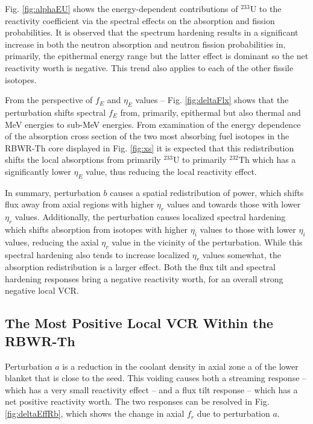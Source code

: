 \documentclass[11pt]{article}
\newcommand{\iso}[2]{$^{#2}\mathrm{#1}$}
\begin{document}
Fig. \ref{fig:alphaEU} shows the energy-dependent contributions of \iso{U}{233} to the reactivity coefficient via the spectral effects on the absorption and fission probabilities.
It is observed that the spectrum hardening results in a significant increase in both the neutron absorption and neutron fission probabilities in, primarily, the epithermal energy range but the latter effect is dominant so the net reactivity worth is negative.
This trend also applies to each of the other fissile isotopes.

From the perspective of $f_E$ and $\eta_E$ values -- Fig. \ref{fig:deltaFlx} shows that the perturbation shifts spectral $f_E$ from, primarily, epithermal but also thermal and MeV energies to sub-MeV energies.
From examination of the energy dependence of the absorption cross section of the two most absorbing fuel isotopes in the RBWR-Th core displayed in Fig. \ref{fig:xs} it is expected that this redistribution shifts the local absorptions from primarily \iso{U}{233} to primarily \iso{Th}{232} which has a significantly lower $\eta_E$ value, thus reducing the local reactivity effect.

In summary, perturbation $b$ causes a spatial redistribution of power, which shifts flux away from axial regions with higher $\eta_r$ values and towards those with lower $\eta_r$ values.
Additionally, the perturbation causes localized spectral hardening which shifts absorption from isotopes with higher $\eta_i$ values to those with lower $\eta_i$ values, reducing the axial $\eta_r$ value in the vicinity of the perturbation.
While this spectral hardening also tends to increase localized $\eta_r$ values somewhat, the absorption redistribution is a larger effect.
Both the flux tilt and spectral hardening responses bring a negative reactivity worth, for an overall strong negative local VCR.

\subsection{The Most Positive Local VCR Within the RBWR-Th}

Perturbation $a$ is a reduction in the coolant density in axial zone a of the lower blanket that is close to the seed.
This voiding causes both a streaming response -- which has a very small reactivity effect -- and a flux tilt response -- which has a net positive reactivity worth.
The two responses can be resolved in Fig. \ref{fig:deltaEffRb}, which shows the change in axial $f_r$ due to perturbation $a$.
\end{document}
